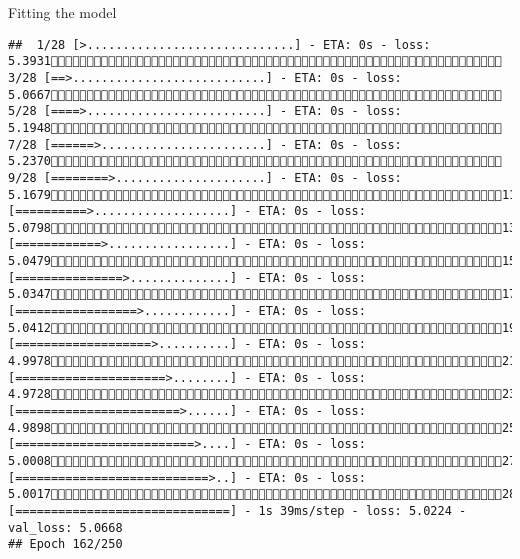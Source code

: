 \documentclass[
  ignorenonframetext,
]{beamer}
\begin{document}
\begin{frame}[fragile]{Fitting the model}
\begin{verbatim}
##  1/28 [>.............................] - ETA: 0s - loss: 5.3931 3/28 [==>...........................] - ETA: 0s - loss: 5.0667 5/28 [====>.........................] - ETA: 0s - loss: 5.1948 7/28 [======>.......................] - ETA: 0s - loss: 5.2370 9/28 [========>.....................] - ETA: 0s - loss: 5.167911/28 [==========>...................] - ETA: 0s - loss: 5.079813/28 [============>.................] - ETA: 0s - loss: 5.047915/28 [===============>..............] - ETA: 0s - loss: 5.034717/28 [=================>............] - ETA: 0s - loss: 5.041219/28 [===================>..........] - ETA: 0s - loss: 4.997821/28 [=====================>........] - ETA: 0s - loss: 4.972823/28 [=======================>......] - ETA: 0s - loss: 4.989825/28 [=========================>....] - ETA: 0s - loss: 5.000827/28 [===========================>..] - ETA: 0s - loss: 5.001728/28 [==============================] - 1s 39ms/step - loss: 5.0224 - val_loss: 5.0668
## Epoch 162/250

\end{verbatim}
\end{frame}
\end{document}
